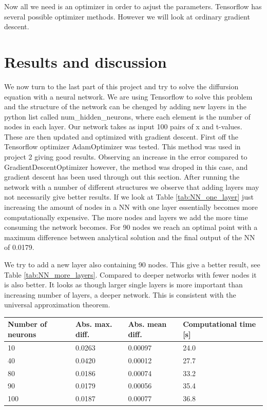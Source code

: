 \documentclass[a4paper, twocolumn]{article}
\newcommand{\tab}[1]{Table \ref{tab:#1}}
\begin{document}
Now all we need is an optimizer in order to asjust the parameters. Tensorflow has several possible optimizer methods. However we will look at ordinary gradient descent.

\section{Results and discussion}
We now turn to the last part of this project and try to solve the diffursion equation with a neural network. We are using Tensorflow to solve this problem and the structure of the network can be chenged by adding new layers in the python list called num\_hidden\_neurons, where each element is the number of nodes in each layer. Our network takes as input 100 pairs of x and t-values. These are then updated and optimized with gradient descent. 
First off the Tensorflow optimizer AdamOptimizer was tested. This method was used in project 2 giving good results. Observing an increase in the error compared to GradientDescentOptimizer however, the method was droped in this case, and gradient descent has been used through out this section.
After running the network with a number of different structures we observe that adding layers may not necessarily give better results. If we look at \tab{NN_one_layer} just increasing the amount of nodes in a NN with one layer essentially becomes more computationally expensive. The more nodes and layers we add the more time consuming the network becomes. For 90 nodes we reach an optimal point with a maximum difference between analytical solution and the final output of the NN of 0.0179. 

We try to add a new layer also containing 90 nodes. This give a better result, see \tab{NN_more_layers}. Compared to deeper networks with fewer nodes it is also better. It looks as though larger single layers is more important than increasing number of layers, a deeper network. This is consistent with the universal approximation theorem.


\begin{strip}
\begin{center}
 \label{tab:NN_one_layer} 
    \begin{tabular}{| l | l | l | l |}
    \hline
    Number of neurons & Abs. max. diff. & Abs. mean diff. & Computational time [s]\\ \hline
    10 & 0.0263 & 0.00097 & 24.0 \\ \hline
    40 & 0.0420 & 0.00012 & 27.7 \\ \hline
    80 & 0.0186 & 0.00074 & 33.2 \\ \hline
    90 & 0.0179 & 0.00056 & 35.4 \\ \hline
    100 & 0.0187 & 0.00077 & 36.8 \\ 
    \hline
    \end{tabular} 
\end{center}
\end{strip}
\end{document}
